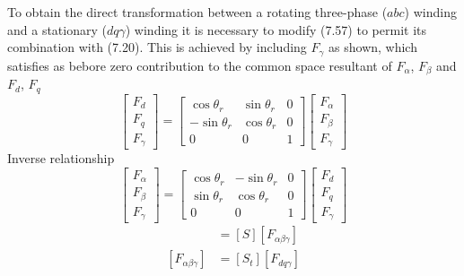 \documentclass[a4paper,numbers=noenddot,12pt]{scrbook}
\begin{document}
    To obtain the direct transformation between  a rotating three-phase ($abc$) winding and a stationary ($dq\gamma$) winding it is necessary to modify (7.57) to permit its combination with (7.20). This is achieved by including $F_{\gamma}$ as shown, which satisfies as bebore zero contribution to the common space resultant of $F_{\alpha}$, $F_{\beta}$ and $F_d$, $F_q$
    \begin{equation}
        \begin{bmatrix}
            F_d \\ F_q \\ F_{\gamma}
        \end{bmatrix}
        =
        \begin{bmatrix}
            \cos \theta_r & \sin \theta_r & 0 \\
            -\sin \theta_r & \cos \theta_r & 0 \\
            0 & 0 &1
        \end{bmatrix}
        \begin{bmatrix}
            F_{\alpha} \\ F_{\beta} \\ F_{\gamma}
        \end{bmatrix}
        \label{eq:Eq7.58}
    \end{equation}
    Inverse relationship
    \begin{equation}
        \begin{bmatrix}
            F_{\alpha} \\ F_{\beta} \\ F_{\gamma}
        \end{bmatrix}
        =
        \begin{bmatrix}
            \cos \theta_r & -\sin \theta_r & 0 \\
            \sin \theta_r & \cos \theta_r & 0 \\
            0 & 0 &1
        \end{bmatrix}
        \begin{bmatrix}
            F_d \\ F_q \\ F_{\gamma}
        \end{bmatrix}
        \label{eq:Eq7.59}
    \end{equation}
    \begin{align}
        [F_{d q \gamma}] & = [S] [F_{\alpha \beta \gamma}] \\
        [F_{\alpha \beta \gamma}] & = [S_t] [F_{d q \gamma}] 
        \label{eq:Eq7.61}
    \end{align}
\end{document}
